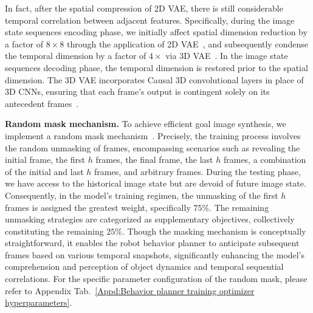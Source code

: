 In fact, after the spatial compression of 2D VAE, there is still considerable temporal correlation between adjacent features.
Specifically, during the image state sequences encoding phase, we initially affect spatial dimension reduction by a factor of $8\times8$ through the application of 2D VAE~\citep{rombach2022high2dvae}, and subsequently condense the temporal dimension by a factor of $4\times$ via 3D VAE~\citep{yu2023language3dvae}.
In the image state sequences decoding phase, the temporal dimension is restored prior to the spatial dimension. 
The 3D VAE incorporates Causal 3D convolutional layers in place of 3D CNNs, ensuring that each frame's output is contingent solely on its antecedent frames~\citep{yu2023language3dvae}.

\textbf{Random mask mechanism.} 
To achieve efficient goal image synthesis, we implement a random mask mechanism~\citep{tay2022ul2}. 
Precisely, the training process involves the random unmasking of frames, encompassing scenarios such as revealing the initial frame, the first $h$ frames, the final frame, the last $h$ frames, a combination of the initial and last $h$ frames, and arbitrary frames.
During the testing phase, we have access to the historical image state but are devoid of future image state. 
Consequently, in the model's training regimen, the unmasking of the first $h$ frames is assigned the greatest weight, specifically $75\%$. The remaining unmasking strategies are categorized as supplementary objectives, collectively constituting the remaining $25\%$.
Though the masking mechanism is conceptually straightforward, it enables the robot behavior planner to anticipate subsequent frames based on various temporal snapshots, significantly enhancing the model's comprehension and perception of object dynamics and temporal sequential correlations.
For the specific parameter configuration of the random mask, please refer to Appendix Tab.~\ref{Appd:Behavior planner training optimizer hyperparameters}.

